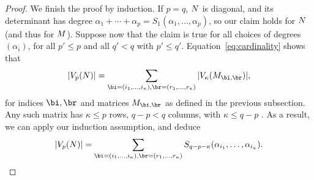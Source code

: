 \documentclass[12pt]{article}
\begin{document}
\begin{proof}
  We finish the proof by induction. If $p=q$, ${N}$ is diagonal, and
  its determinant has degree $\alpha_1 + \cdots + \alpha_p =
  S_1(\alpha_1,\dots,\alpha_p)$, so our claim holds for ${N}$ (and
  thus for ${M}$). Suppose now that the claim is true for all choices
  of degrees $(\alpha_i)$, for all $p'\le p$ and all $q' < q$ with $p'
  \le q'$. Equation~\eqref{eq:cardinality} shows that 
$$
    |V_p(\mN)| = \sum_{\bi=(i_1,\dots,i_\kappa),\br=(r_1,\dots,r_\kappa)}  |V_\kappa(\mM_{\bi,\br})|,
$$
  for indices $\bi,\br$ and matrices $\mM_{\bi,\br}$ as defined  in the 
  previous subsection. Any such matrix has $\kappa \le p$ rows,
  $q-p < q$ columns, with $\kappa \le q-p$ . As a result, we 
  can apply our induction assumption, and deduce
 $$
    |V_p(\mN)| = \sum_{\bi=(i_1,\dots,i_\kappa),\br=(r_1,\dots,r_\kappa)}  S_{q-p-\kappa}(\alpha_{i_1},\dots,\alpha_{i_\kappa}).
$$

\end{proof}













\end{document}
